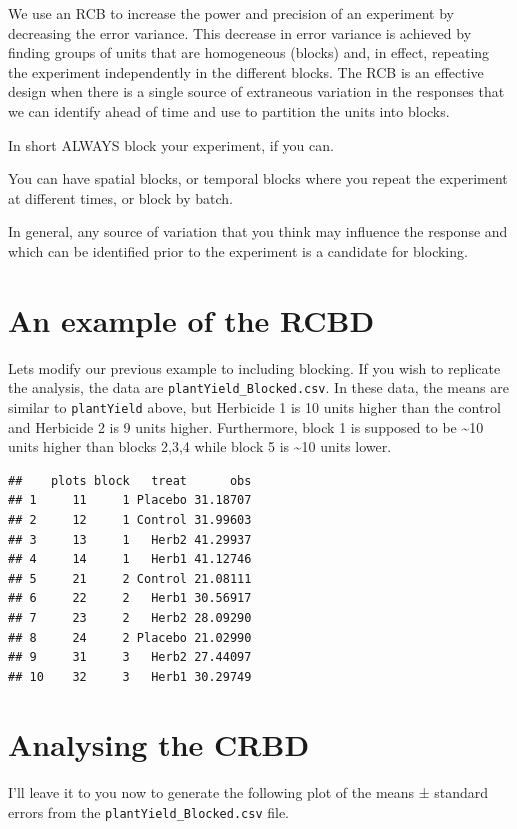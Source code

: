 \documentclass[
]{book}
\begin{document}
We use an RCB to increase the power and precision of an experiment by decreasing the error variance. This decrease in error variance is achieved by finding groups of units that are homogeneous (blocks) and, in effect, repeating the experiment independently in the different blocks. The RCB is an effective design when there is a single source of extraneous variation in the responses that we can identify ahead of time and use to partition the units into blocks.

In short ALWAYS block your experiment, if you can.

You can have spatial blocks, or temporal blocks where you repeat the experiment at different times, or block by batch.

In general, any source of variation that you think may influence the response and which can be identified prior to the experiment is a candidate for blocking.

\hypertarget{an-example-of-the-rcbd}{%
\section{An example of the RCBD}\label{an-example-of-the-rcbd}}

Lets modify our previous example to including blocking. If you wish to replicate the analysis, the data are \texttt{plantYield\_Blocked.csv}. In these data, the means are similar to \texttt{plantYield} above, but Herbicide 1 is 10 units higher than the control and Herbicide 2 is 9 units higher. Furthermore, block 1 is supposed to be \textasciitilde10 units higher than blocks 2,3,4 while block 5 is \textasciitilde10 units lower.

\begin{verbatim}
##    plots block   treat      obs
## 1     11     1 Placebo 31.18707
## 2     12     1 Control 31.99603
## 3     13     1   Herb2 41.29937
## 4     14     1   Herb1 41.12746
## 5     21     2 Control 21.08111
## 6     22     2   Herb1 30.56917
## 7     23     2   Herb2 28.09290
## 8     24     2 Placebo 21.02990
## 9     31     3   Herb2 27.44097
## 10    32     3   Herb1 30.29749
\end{verbatim}

\hypertarget{analysing-the-crbd}{%
\section{Analysing the CRBD}\label{analysing-the-crbd}}

I'll leave it to you now to generate the following plot of the means ± standard errors from the \texttt{plantYield\_Blocked.csv} file.
\end{document}
